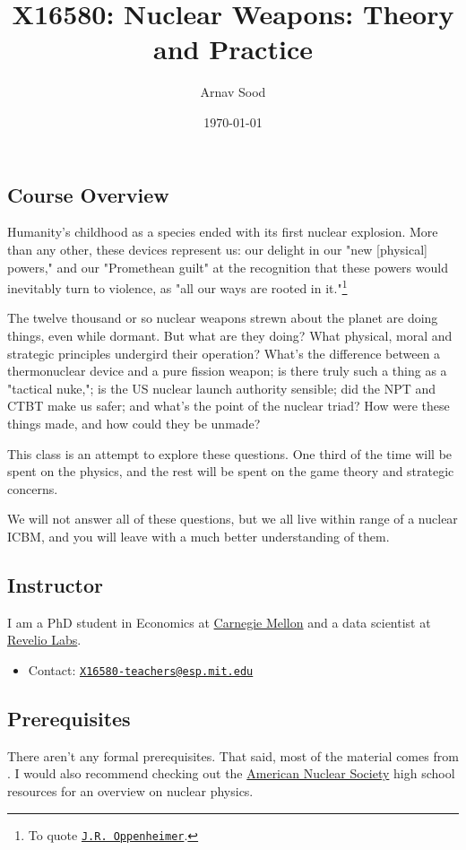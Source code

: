 \documentclass[10pt,oneside]{amsart}
\title{X16580: Nuclear Weapons: Theory and Practice}
\author{Arnav Sood}
\date{\today}
\theoremstyle{definition}
\begin{document}
\maketitle

\subsection*{Course Overview} Humanity's childhood as a species ended with its first nuclear explosion. More than any other, these devices represent us: our delight in our "new [physical] powers," and our "Promethean guilt" at the recognition that these powers would inevitably turn to violence, as "all our ways are rooted in it."\footnote{To quote \href{http://large.stanford.edu/courses/2016/ph241/anderson1/}{\tt J.R. Oppenheimer}.}

The twelve thousand or so nuclear weapons strewn about the planet are doing things, even while dormant. But what are they doing? What physical, moral and strategic principles undergird their operation? What's the difference between a thermonuclear device and a pure fission weapon; is there truly such a thing as a "tactical nuke,"; is the US nuclear launch authority sensible; did the NPT and CTBT make us safer; and what's the point of the nuclear triad? How were these things made, and how could they be unmade?

This class is an attempt to explore these questions. One third of the time will be spent on the physics, and the rest will be spent on the game theory and strategic concerns.

We will not answer all of these questions, but we all live within range of a nuclear ICBM, and you will leave with a much better understanding of them.

\subsection*{Instructor} I am a PhD student in Economics at \href{https://www.cmu.edu}{Carnegie Mellon} and a data scientist at \href{https://www.reveliolabs.com}{Revelio Labs}.
\begin{itemize}
      \item Contact: \href{mailto:X16580-teachers@esp.mit.edu}{\tt X16580-teachers@esp.mit.edu}
\end{itemize}

\subsection*{Prerequisites} There aren't any formal prerequisites. That said, most of the material comes from \cite{rhodes1986making}. I would also recommend checking out the \href{https://www.ans.org/nuclear/navigatingnuclear/classresources/highschool/}{American Nuclear Society} high school resources for an overview on nuclear physics.
\end{document}

